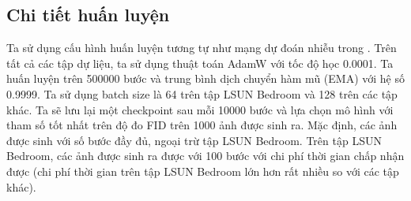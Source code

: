 \documentclass[14pt, a4paper]{article}
\numberwithin{equation}{section}
\numberwithin{figure}{section}
\numberwithin{dl}{section}
\numberwithin{md}{section}
\numberwithin{bd}{section}
\numberwithin{dn}{section}
\numberwithin{hq}{section}
\begin{document}
    \begin{table}[h!]
        \caption{Kích thước của mô hình (MB) và thời gian chạy trung bình (ms) để chạy một bước qua mạng (thời gian để tính toán nhiễu và thời gian để tính toán qua SN và NPR).
        Ta cũng sẽ liệt kê thời gian tăng thêm của SN và NPR tương đối so với mạng dự đoán nhiễu.
        Tất cả được thực hiện với batch size là 10 và trên một GeForce RTX 2080 Ti.}
        \begin{center}
        \end{center}
        \label{table:Model-size}
    \end{table}

    \subsection{Chi tiết huấn luyện}
    
    Ta sử dụng cấu hình huấn luyện tương tự như mạng dự đoán nhiễu trong \cite{bao2021analytic}.
    Trên tất cả các tập dự liệu, ta sử dụng thuật toán AdamW \cite{loshchilov2018decoupled} với tốc độ học 0.0001.
    Ta huấn luyện trên 500000 bước và trung bình dịch chuyển hàm mũ (EMA) với hệ số 0.9999.
    Ta sử dụng batch size là 64 trên tập LSUN Bedroom và 128 trên các tập khác.
    Ta sẽ lưu lại một checkpoint sau mỗi 10000 bước và lựa chọn mô hình với tham số tốt nhất trên độ đo FID trên 1000 ảnh được sinh ra.
    Mặc định, các ảnh được sinh với số bước đầy đủ, ngoại trừ tập LSUN Bedroom.
    Trên tập LSUN Bedroom, các ảnh được sinh ra được với 100 bước với chi phí thời gian chấp nhận được (chi phí thời gian trên tập LSUN Bedroom lớn hơn rất nhiều so với các tập khác).
\end{document}
